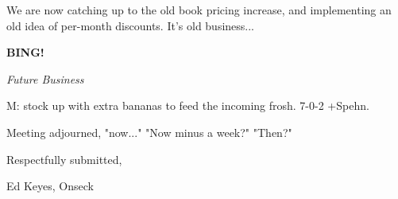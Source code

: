 \documentclass[12pt]{article}
\newcommand{\bing}{{\bf BING!} }
\newcommand{\goto}[1]{\bing \vskip 12pt \centerline{{\em{#1}}}}
\begin{document}
We are now catching up to the old book pricing increase, and implementing an old idea of per-month discounts. It's old business...

\goto{Future Business}

M: stock up with extra bananas to feed the incoming frosh. 7-0-2 +Spehn.

\vspace{12pt}

\noindent
Meeting adjourned, "now..." "Now minus a week?" "Then?"

\vspace{18pt}

\centerline{Respectfully submitted,}
\centerline{Ed Keyes, Onseck}
\end{document}
